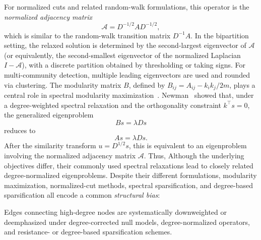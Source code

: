 \documentclass[10pt,journal,compsoc]{IEEEtran}
\begin{document}
For normalized cuts and related random-walk formulations, this operator is
the \emph{normalized adjacency matrix}
\begin{equation}
\mathcal{A} = D^{-1/2} A D^{-1/2},
\label{eq:normalized-adjacency}
\end{equation}
which is similar to the random-walk transition matrix $D^{-1}A$.
In the bipartition setting, the relaxed solution is determined by the
second-largest eigenvector of $\mathcal{A}$ (or equivalently, the
second-smallest eigenvector of the normalized Laplacian $I-\mathcal{A}$),
with a discrete partition obtained by thresholding or taking signs.
For multi-community detection, multiple leading eigenvectors are used and
rounded via clustering.
The modularity matrix $B$, defined by $B_{ij} = A_{ij} - k_i k_j / 2m$,
plays a central role in spectral modularity maximization~\cite{newman2006modularity}.
Newman~\cite{newman2013spectral} showed that, under a degree-weighted spectral
relaxation and the orthogonality constraint $k^\top s = 0$, the generalized
eigenproblem
\begin{equation}
B s = \lambda D s
\label{eq:modularity-eigenvector}
\end{equation}
reduces to
\begin{equation}
A s = \lambda D s.
\label{eq:adjacency-eigenvector}
\end{equation}
After the similarity transform $u = D^{1/2}s$, this is equivalent to an
eigenproblem involving the normalized adjacency matrix $\mathcal{A}$. Thus, Although the underlying objectives differ, their commonly used spectral relaxations lead to closely related degree-normalized eigenproblems.
Despite their different formulations, modularity maximization, normalized-cut
methods, spectral sparsification, and degree-based sparsification all encode
a common \emph{structural bias}:

Edges connecting high-degree nodes are systematically downweighted or deemphasized under degree-corrected null models, degree-normalized operators, and resistance- or degree-based sparsification schemes.
\end{document}
